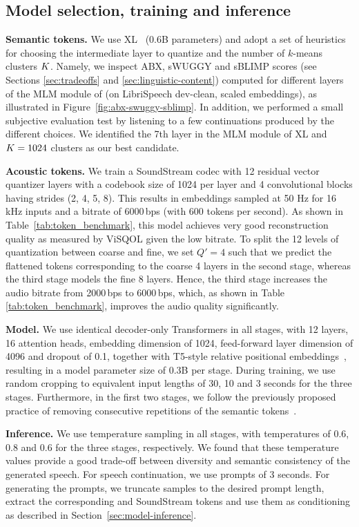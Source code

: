 \documentclass[letterpaper,10 pt]{IEEEtran}
\begin{document}
\subsection{Model selection, training and inference}
\textbf{Semantic tokens.} We use \wvbert XL~\cite{w2vbert}  (0.6B parameters) and adopt a set of heuristics for choosing the intermediate layer to quantize and the number of $k$-means clusters $K$. Namely, we inspect ABX, sWUGGY and sBLIMP scores (see Sections \ref{sec:tradeoffs} and \ref{sec:linguistic-content}) computed for different layers of the MLM module of \wvbert (on LibriSpeech dev-clean, scaled embeddings), as illustrated in Figure~\ref{fig:abx-swuggy-sblimp}. In addition, we performed a small subjective evaluation test by listening to a few continuations produced by the different choices. We identified the 7th layer in the MLM module of \wvbert XL and $K=1024$ clusters as our best candidate. 

\textbf{Acoustic tokens.} We train a SoundStream codec with 12 residual vector quantizer layers with a codebook size of 1024 per layer and 4 convolutional blocks having strides (2, 4, 5, 8). This results in  embeddings sampled at 50 Hz for 16 kHz inputs and a bitrate of 6000\,bps (with 600 tokens per second). As shown in  Table~\ref{tab:token_benchmark}, this model achieves very good reconstruction quality as measured by ViSQOL given the low bitrate. To split the 12 levels of quantization between coarse and fine, we set $Q'=4$ such that we predict the flattened tokens corresponding to the coarse 4 layers in the second stage, whereas the third stage models the fine 8 layers. Hence, the third stage increases the audio bitrate from 2000\,bps to 6000\,bps, which, as shown in Table \ref{tab:token_benchmark}, improves the audio quality significantly. 

\textbf{Model.} We use identical decoder-only Transformers in all stages, with 12 layers, 16 attention heads, embedding dimension of 1024, feed-forward layer dimension of 4096 and dropout of 0.1, together with T5-style relative positional embeddings~\cite{t5}, resulting in a model parameter size of 0.3B per stage. During training, we use random cropping to equivalent input lengths of 30, 10 and 3 seconds for the three stages. Furthermore, in the first two stages, we follow the previously proposed practice of removing consecutive repetitions of the semantic tokens~\cite{lakhotia2021generative}. 

\textbf{Inference.} We use temperature sampling in all stages, with temperatures of 0.6, 0.8 and 0.6 for the three stages, respectively. We found that these temperature values provide a good trade-off between diversity and semantic consistency of the generated speech. For speech continuation, we use prompts of 3 seconds. For generating the prompts, we truncate samples to the desired prompt length, extract the corresponding \wvbert and SoundStream tokens and use them as conditioning as described in Section~\ref{sec:model-inference}.
\end{document}
